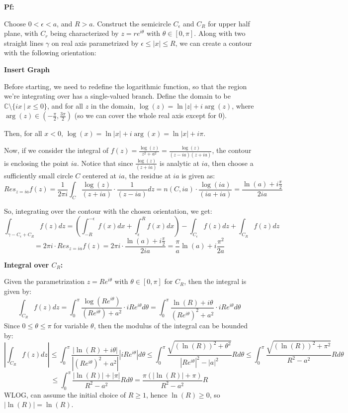 \documentclass{article}
\begin{document}
\textbf{Pf:}

Choose $0<\epsilon<a$, and $R>a$. Construct the semicircle $C_\epsilon$ and $C_R$ for upper half plane, with $C_r$ being characterized by $z=re^{i\theta}$ with $\theta\in[0,\pi]$.
Along with two straight lines $\gamma$ on real axis parametrized by $\epsilon\leq |x|\leq R$, we can create a contour with the following orientation:

\textbf{Insert Graph}

Before starting, we need to redefine the logarithmic function, so that the region we're integrating over has a single-valued branch.
Define the domain to be $\mathbb{C}\setminus\{ix\ |\ x\leq 0\}$, and for all $z$ in the domain, $\log(z)=\ln|z|+i\arg(z)$, where $\arg(z)\in (-\frac{\pi}{2},\frac{3\pi}{2})$ (so we can cover the whole real axis except for $0$).

Then, for all $x<0$, $\log(x)=\ln|x|+i\arg(x)=\ln|x|+i\pi$.

\hfil

Now, if we consider the integral of $f(z)=\frac{\log(z)}{z^2+a^2}=\frac{\log(z)}{(z-ia)(z+ia)}$, the contour is enclosing the point $ia$. 
Notice that since $\frac{\log(z)}{(z+ia)}$ is analytic at $ia$, then choose a sufficiently small circle $C$ centered at $ia$, the residue at $ia$ is given as:
$$Res_{z=ia}f(z) = \frac{1}{2\pi i}\int_{C}\frac{\log(z)}{(z+ia)}\cdot\frac{1}{(z-ia)}dz = n(C,ia)\cdot \frac{\log(ia)}{(ia+ia)} = \frac{\ln(a)+i\frac{\pi}{2}}{2ia}$$

So, integrating over the contour with the chosen orientation, we get:
$$\int_{\gamma - C_\epsilon + C_R}f(z)dz = \left(\int_{-R}^{-\epsilon}f(x)dx+\int_{\epsilon}^{R}f(x)dx\right) - \int_{C_\epsilon}f(z)dz + \int_{C_R}f(z)dz$$
$$ = 2\pi i\cdot Res_{z=ia}f(z) = 2\pi i\cdot \frac{\ln(a)+i\frac{\pi}{2}}{2ia} = \frac{\pi}{a}\ln(a)+i\frac{\pi^2}{2a}$$

\hfil

\textbf{Integral over $C_R$:}

Given the parametrization $z=Re^{i\theta}$ with $\theta\in [0,\pi]$ for $C_R$, then the integral is given by:
$$\int_{C_R}f(z)dz = \int_{0}^{\pi}\frac{\log(Re^{i\theta})}{(Re^{i\theta})+a^2}\cdot iRe^{i\theta}d\theta = \int_{0}^{\pi}\frac{\ln(R) + i\theta}{(Re^{i\theta})^2+a^2}\cdot iRe^{i\theta}d\theta$$
Since $0\leq \theta \leq \pi$ for variable $\theta$, then the modulus of the integral can be bounded by:
$$\left|\int_{C_R}f(z)dz\right|\leq \int_{0}^{\pi}\frac{|\ln(R) + i\theta|}{|(Re^{i\theta})^2+a^2|}|iRe^{i\theta}|d\theta \leq \int_{0}^{\pi}\frac{\sqrt{(\ln(R))^2+\theta^2}}{|Re^{i\theta}|^2-|a|^2}Rd\theta \leq \int_{0}^{\pi}\frac{\sqrt{(\ln(R))^2+\pi^2}}{R^2-a^2}Rd\theta$$
$$\leq \int_{0}^{\pi}\frac{|\ln(R)|+|\pi|}{R^2-a^2}Rd\theta = \frac{\pi(|\ln(R)|+\pi)}{R^2-a^2}R$$
WLOG, can assume the initial choice of $R\geq 1$, hence $\ln(R)\geq 0$, so $|\ln(R)|=\ln(R)$.
\end{document}
